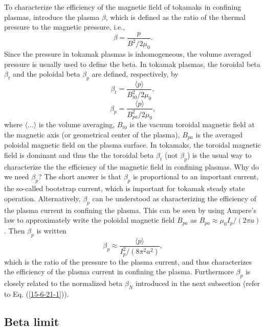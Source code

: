 \documentclass{article}
\begin{document}
To characterize the efficiency of the magnetic field of tokamaks in confining
plasmas, introduce the plasma $\beta$, which is defined as the ratio of the
thermal pressure to the magnetic pressure, i.e.,
\begin{equation}
  \beta = \frac{p}{B^2 / 2 \mu_0} .
\end{equation}
Since the pressure in tokamak plasmas is inhomogeneous, the volume averaged
pressure is usually used to define the beta. In tokamak plasmas, the toroidal
beta $\beta_t$ and the poloidal beta $\beta_p$ are defined, respectively, by
\begin{equation}
  \beta_t = \frac{\langle p \rangle}{B^2_{t 0} / 2 \mu_0},
\end{equation}
\begin{equation}
  \beta_p = \frac{\langle p \rangle}{B^2_{p a} / 2 \mu_0},
\end{equation}
where $\langle \ldots \rangle$ is the volume averaging, $B_{t 0}$ is the
vacuum toroidal magnetic field at the magnetic axis (or geometrical center of
the plasma), $B_{p a}$ is the averaged poloidal magnetic field on the plasma
surface. In tokamaks, the toroidal magnetic field is dominant and thus the the
toroidal beta $\beta_t$ (not $\beta_p$) is the usual way to characterize the
the efficiency of the magnetic field in confining plasmas. Why do we need
$\beta_p$? The short answer is that $\beta_p$ is proportional to an important
current, the so-called bootstrap current, which is important for tokamak
steady state operation. Alternatively, $\beta_p$ can be understood as
characterizing the efficiency of the plasma current in confining the plasma.
This can be seen by using Ampere's law to approximately write the poloidal
magnetic field $B_{p a}$ as $B_{p a} \approx \mu_0 I_p / (2 \pi a)$. Then
$\beta_p$ is written
\begin{equation}
  \label{7-25-1m} \beta_p \approx \frac{\langle p \rangle}{I_p^2 / (8 \pi^2
  a^2)},
\end{equation}
which is the ratio of the pressure to the plasma current, and thus
characterizes the efficiency of the plasma current in confining the plasma.
Furthermore $\beta_p$ is closely related to the normalized beta $\beta_N$
introduced in the next subsection (refer to Eq. (\ref{15-6-21-1})).

\subsection{Beta limit}
\end{document}
